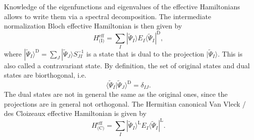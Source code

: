 Knowledge of the eigenfunctions and eigenvalues of the effective Hamiltonians allows to write them via a spectral decomposition. The intermediate normalization Bloch effective Hamiltonian\cite{Bloch_1958_329} is then given by
\begin{equation}
\label{Eq:HeffBloch}
  H^\text{eff}_\text{(I)} = \sum_I |\tilde{\Psi}_I\rangle E_I \langle \tilde{\Psi}_I |^\text{D},
\end{equation}
where $ | \tilde{\Psi}_I \rangle^\text{D} = \sum_J |\tilde{\Psi}_J\rangle S_{JI}^{-1}$ is a state that is dual to the projection $|\tilde{\Psi}_I\rangle$. This is also called a contravariant state. By definition, the set of original states and dual states are biorthogonal, i.e.
\begin{equation}
\langle \tilde{\Psi}_I|\tilde{\Psi}_J\rangle^\text{D} = \delta_{IJ}.
\end{equation}
The dual states are not in general the same as the original ones, since the projections are in general not orthogonal. The Hermitian canonical Van Vleck / des Cloizeaux\cite{Cloiz_1960_321} effective Hamiltonian is given by
\begin{equation}
\label{Eq:HeffCVV}
  H^\text{eff}_\text{(C)} = \sum_I |\tilde{\Psi}_I\rangle^\text{L} E_I \langle \tilde{\Psi}_I |^\text{L}.
\end{equation}

